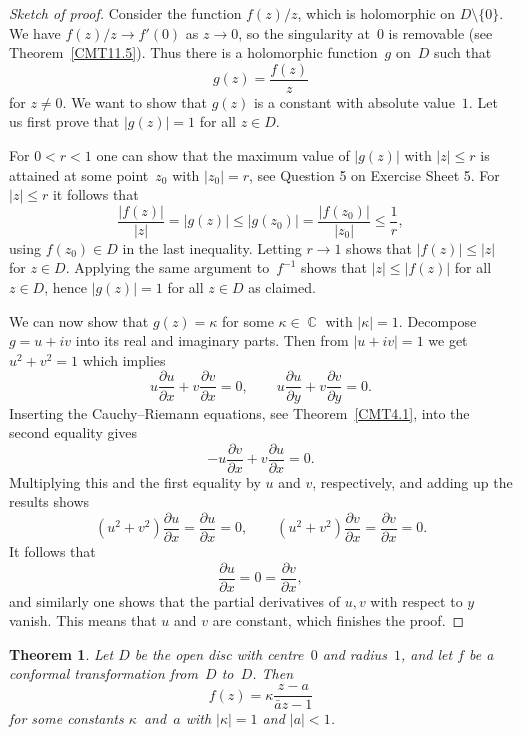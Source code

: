 \documentclass{amsproc}
\newtheorem{theorem}{Theorem}[subsection]
\theoremstyle{definition}
\theoremstyle{remark}
\DeclareMathOperator{\C}{\mathbb{C}}
\numberwithin{equation}{section}
\begin{document}
\begin{proof}[Sketch of proof]
Consider the function $ f(z)/z $, which is holomorphic on $ D \setminus \{0\} $. We have $ f(z)/z \to f'(0) $ as $ z \to 0 $, so the singularity at~$ 0 $ is
removable (see Theorem~\ref{CMT11.5}). Thus there is a holomorphic function~$ g $ on~$ D $ such that
$$
g(z) = \dfrac{f(z)}{z}
$$
for $ z \neq 0 $. We want to show that $ g(z) $ is a constant with absolute value~$ 1 $.
Let us first prove that $ |g(z)| = 1 $ for all $ z \in D $.

For $ 0 < r < 1 $ one can show that the maximum value of $ |g(z)| $ with $ |z| \leq r $ is attained at some point~$ z_0 $ with $ |z_0| = r $, see Question 5 on Exercise Sheet 5.
For $ |z| \leq r $ it follows that
$$
\dfrac{|f(z)|}{|z|} = |g(z)| \leq |g(z_0)| = \dfrac{|f(z_0)|}{|z_0|} \leq \dfrac{1}{r},
$$
using $ f(z_0) \in D $ in the last inequality.
Letting $ r \to 1 $ shows that $ |f(z)| \leq |z| $ for $ z \in D $. Applying the same argument to~$ f^{-1} $ shows that $ |z| \leq |f(z)| $ for all $ z \in D $, hence $ |g(z)| = 1 $
for all $ z \in D $ as claimed.

We can now show that $ g(z) = \kappa $ for some $ \kappa \in \C $ with $ |\kappa| = 1 $. Decompose $ g = u + iv $ into its real and imaginary parts. Then from
$ |u + iv| = 1 $ we get $ u^2 + v^2 = 1 $ which implies
$$
u \frac{\partial u}{\partial x} + v \frac{\partial v}{\partial x} = 0, \qquad u \frac{\partial u}{\partial y} + v \frac{\partial v}{\partial y} = 0.
$$
Inserting the Cauchy--Riemann equations, see Theorem~\ref{CMT4.1}, into the second equality gives
$$
- u \frac{\partial v}{\partial x} + v \frac{\partial u}{\partial x} = 0.
$$
Multiplying this and the first equality by $ u $ and $ v $, respectively, and adding up the results shows
$$
(u^2 + v^2)\frac{\partial u}{\partial x} = \frac{\partial u}{\partial x} = 0, \qquad (u^2 + v^2)\frac{\partial v}{\partial x} = \frac{\partial v}{\partial x} = 0.
$$
It follows that
$$
\frac{\partial u}{\partial x} = 0 =  \frac{\partial v}{\partial x},
$$
and similarly one shows that the partial derivatives of $ u, v $ with respect to $ y $ vanish. This means that $ u $ and $ v $ are constant, which finishes the proof.
\end{proof}

\begin{theorem} \label{CMT15.3}
Let $ D $ be the open disc with centre~$ 0 $ and radius~$ 1 $, and let $ f $ be a conformal transformation from~$ D $ to~$ D $. Then
$$
f(z) = \kappa\dfrac{z - a}{\bar{a} z - 1}
$$
for some constants $ \kappa $~and~$ a $ with $ |\kappa| = 1 $ and $ |a| < 1 $.
\end{theorem}
\end{document}
